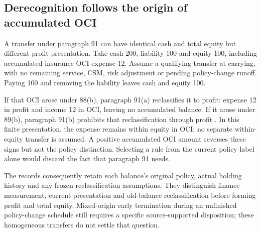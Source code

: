 \subsection{Derecognition follows the origin of accumulated OCI}
\label{sec:insurance-origin-derecognition}

A transfer under paragraph 91 can have identical cash and total equity but
different profit presentation. Take cash 200, liability 100 and equity 100,
including accumulated insurance OCI expense 12. Assume a qualifying transfer
at carrying, with no remaining service, CSM, risk adjustment or pending
policy-change runoff. Paying 100 and removing the liability leaves cash and
equity 100.

If that OCI arose under 88(b), paragraph 91(a) reclassifies it to profit:
expense 12 in profit and income 12 in OCI, leaving no accumulated balance.
If it arose under 89(b), paragraph 91(b) prohibits that reclassification
through profit \citep[IFRS~17.91]{eu20231803}. In this finite presentation,
the expense remains within equity in OCI; no separate within-equity transfer
is assumed. A positive accumulated OCI amount reverses these signs but not
the policy distinction. Selecting a rule from the current policy label alone
would discard the fact that paragraph 91 needs.

The records consequently retain each balance's original policy, actual holding
history and any frozen reclassification assumptions. They distinguish finance
measurement, current presentation and old-balance reclassification before
forming profit and total equity. Mixed-origin early termination during an
unfinished policy-change schedule still requires a specific source-supported
disposition; these homogeneous transfers do not settle that question.
